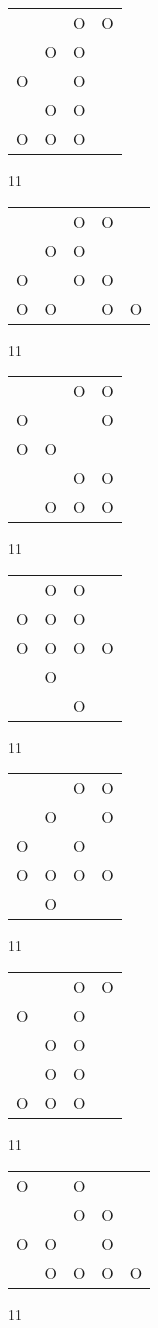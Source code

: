 \begin{tabular}{|m{0.2cm}m{0.2cm}m{0.2cm}m{0.2cm}|}\hline
 & &O&O\\
 &O&O& \\
O& &O& \\
 &O&O& \\
O&O&O& \\
\hline\end{tabular}11
\begin{tabular}{|m{0.2cm}m{0.2cm}m{0.2cm}m{0.2cm}m{0.2cm}|}\hline
 & &O&O& \\
 &O&O& & \\
O& &O&O& \\
O&O& &O&O\\
\hline\end{tabular}11
\begin{tabular}{|m{0.2cm}m{0.2cm}m{0.2cm}m{0.2cm}|}\hline
 & &O&O\\
O& & &O\\
O&O& & \\
 & &O&O\\
 &O&O&O\\
\hline\end{tabular}11
\begin{tabular}{|m{0.2cm}m{0.2cm}m{0.2cm}m{0.2cm}|}\hline
 &O&O& \\
O&O&O& \\
O&O&O&O\\
 &O& & \\
 & &O& \\
\hline\end{tabular}11
\begin{tabular}{|m{0.2cm}m{0.2cm}m{0.2cm}m{0.2cm}|}\hline
 & &O&O\\
 &O& &O\\
O& &O& \\
O&O&O&O\\
 &O& & \\
\hline\end{tabular}11
\begin{tabular}{|m{0.2cm}m{0.2cm}m{0.2cm}m{0.2cm}|}\hline
 & &O&O\\
O& &O& \\
 &O&O& \\
 &O&O& \\
O&O&O& \\
\hline\end{tabular}11
\begin{tabular}{|m{0.2cm}m{0.2cm}m{0.2cm}m{0.2cm}m{0.2cm}|}\hline
O& &O& & \\
 & &O&O& \\
O&O& &O& \\
 &O&O&O&O\\
\hline\end{tabular}11
